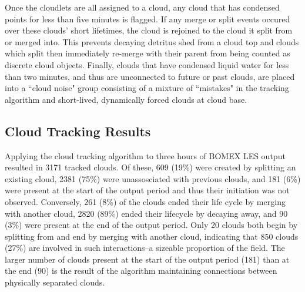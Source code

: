\documentclass[acp]{copernicus}
\begin{document}
Once the cloudlets are all assigned to a cloud, any cloud that has condensed 
points for less than five minutes is flagged.  If any merge or split events 
occured over these clouds' short lifetimes, the cloud is rejoined to the cloud 
it split from or merged into.  This prevents decaying detritus shed from a 
cloud top and clouds which split then immediately re-merge with their parent 
from being counted as discrete cloud objects.  Finally, clouds that have 
condensed liquid water for less than two minutes, and thus are unconnected to 
future or past clouds, are placed into a ``cloud noise" group consisting of a 
mixture of ``mistakes" in the tracking algorithm and short-lived, dynamically 
forced clouds at cloud base. 

\subsection{Cloud Tracking Results}

Applying the cloud tracking algorithm to three hours of BOMEX LES output 
resulted in 3171 tracked clouds.  Of these, 609 (19\%) were created by 
splitting an existing cloud, 2381 (75\%) were unassosciated with previous 
clouds, and 181 (6\%) were present at the start of the output period and thus 
their initiation was not observed.  Conversely, 261 (8\%) of the clouds ended 
their life cycle by merging with another cloud, 2820 (89\%) ended their 
lifecycle by decaying away, and 90 (3\%) were present at the end of the output 
period.  Only 20 clouds both begin by splitting from and end by merging with 
another cloud, indicating that 850 clouds (27\%) are involved in such 
interactions--a sizeable proportion of the field.  The larger number of clouds 
present at the start of the output period (181) than at the end (90) is the 
result of the algorithm maintaining connections between physically separated 
clouds.
\end{document}
